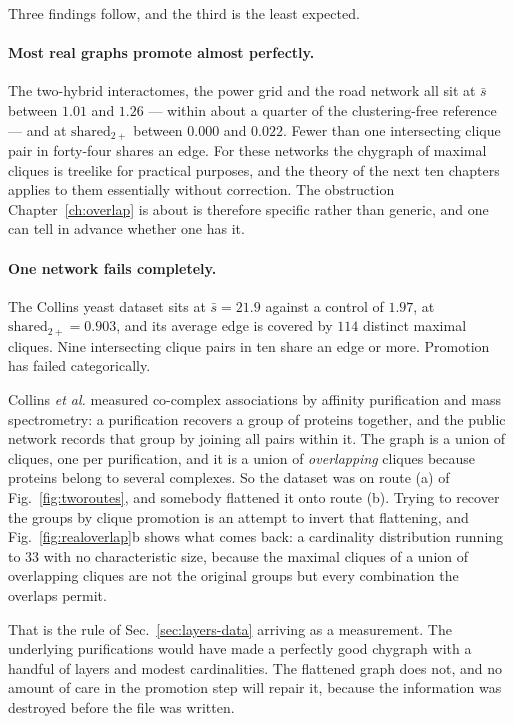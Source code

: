 Three findings follow, and the third is the least expected.

\paragraph{Most real graphs promote almost perfectly.} The two-hybrid
interactomes, the power grid and the road network all sit at $\bar s$ between
$1.01$ and $1.26$ --- within about a quarter of the clustering-free reference
--- and at $\mathrm{shared}_{2+}$ between $0.000$ and $0.022$. Fewer than one
intersecting clique pair in forty-four shares an edge. For these networks the
chygraph of maximal cliques is treelike for practical purposes, and the theory
of the next ten chapters applies to them essentially without correction. The
obstruction Chapter~\ref{ch:overlap} is about is therefore specific rather than
generic, and one can tell in advance whether one has it.

\paragraph{One network fails completely.} The
Collins yeast dataset sits at $\bar s=21.9$ against a control of $1.97$, at
$\mathrm{shared}_{2+}=0.903$, and its average edge is covered by $114$ distinct
maximal cliques. Nine intersecting clique pairs in ten share an edge or more.
Promotion has failed categorically.

Collins \emph{et al.} measured
co-complex associations by affinity purification and mass spectrometry: a
purification recovers a group of proteins together, and the public network
records that group by joining all pairs within it. The graph is a union of
cliques, one per purification, and it is a union of \emph{overlapping} cliques
because proteins belong to several complexes. So the dataset was on route (a) of
Fig.~\ref{fig:tworoutes}, and somebody flattened it onto route (b). Trying to
recover the groups by clique promotion is an attempt to invert that flattening,
and Fig.~\ref{fig:realoverlap}b shows what comes back: a cardinality
distribution running to $33$ with no characteristic size, because the maximal
cliques of a union of overlapping cliques are not the original groups but every
combination the overlaps permit.

That is the rule of Sec.~\ref{sec:layers-data} arriving as a measurement. The
underlying purifications would have made a perfectly good chygraph with a
handful of layers and modest cardinalities. The flattened graph does not, and no
amount of care in the promotion step will repair it, because the information was
destroyed before the file was written.

